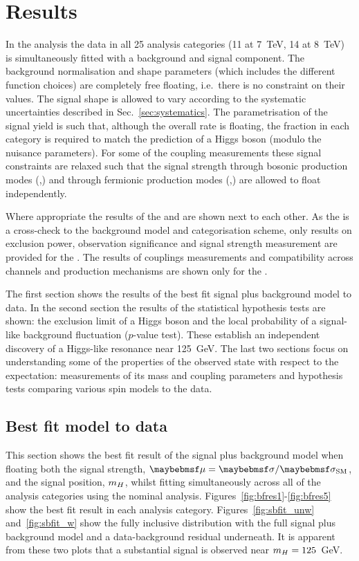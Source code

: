 \chapter{Results}
\label{chap:results}

In the \MFM analysis the data in all 25 analysis categories (11 at 7~TeV, 14 at 8~TeV) is simultaneously fitted with a background and signal component. The background normalisation and shape parameters (which includes the different function choices) are completely free floating, i.e.~there is no constraint on their values. The signal shape is allowed to vary according to the systematic uncertainties described in Sec.~\ref{sec:systematics}. The parametrisation of the signal yield is such that, although the overall rate is floating, the fraction in each category is required to match the prediction of a \SM Higgs boson (modulo the nuisance parameters). For some of the coupling measurements these signal constraints are relaxed such that the signal strength through bosonic production modes (\VBF,\VH) and through fermionic production modes (\ggH,\ttH) are allowed to float independently. 

Where appropriate the results of the \MFM and \SMVA are shown next to each other. As the \SMVA is a cross-check to the background model and categorisation scheme, only results on exclusion power, observation significance and signal strength measurement are provided for the \SMVA. The results of couplings measurements and compatibility across channels and production mechanisms are shown only for the \MFM.

The first section shows the results of the best fit signal plus background model to data. In the second section the results of the statistical hypothesis tests are shown: the exclusion limit of a \SM Higgs boson and the local probability of a signal-like background fluctuation ($p$-value test). These establish an independent discovery of a Higgs-like resonance near 125~GeV. The last two sections focus on understanding some of the properties of the observed state with respect to the \SM expectation: measurements of its mass and coupling parameters and hypothesis tests comparing various spin models to the data.

\section{Best fit model to data}

This section shows the best fit result of the signal plus background model when floating both the signal strength, $\mu=\musm$, and the signal position, $m_{H}$, whilst fitting simultaneously across all of the analysis categories using the nominal \MFM analysis. Figures~\ref{fig:bfres1}-\ref{fig:bfres5} show the best fit result in each analysis category. Figures~\ref{fig:sbfit_unw} and~\ref{fig:sbfit_w} show the fully inclusive distribution with the full signal plus background model and a data-background residual underneath. It is apparent from these two plots that a substantial signal is observed near $m_{H}=125$~GeV.

